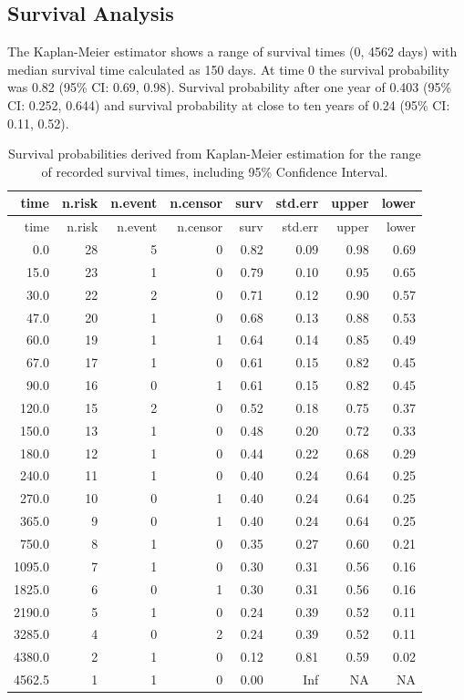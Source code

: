 \documentclass[
  authoryear,
  preprint,
  3p]{elsarticle}
\begin{document}
\hypertarget{survival-analysis-1}{%
\subsection{Survival Analysis}\label{survival-analysis-1}}

The Kaplan-Meier estimator shows a range of survival times (0, 4562
days) with median survival time calculated as 150 days. At time 0 the
survival probability was 0.82 (95\% CI: 0.69, 0.98). Survival
probability after one year of 0.403 (95\% CI: 0.252, 0.644) and survival
probability at close to ten years of 0.24 (95\% CI: 0.11, 0.52).

\begin{longtable}[]{@{}rrrrrrrr@{}}
\caption{Survival probabilities derived from Kaplan-Meier estimation for
the range of recorded survival times, including 95\% Confidence
Interval.}\tabularnewline
\toprule()
time & n.risk & n.event & n.censor & surv & std.err & upper & lower \\
\midrule()
\endfirsthead
\toprule()
time & n.risk & n.event & n.censor & surv & std.err & upper & lower \\
\midrule()
\endhead
0.0 & 28 & 5 & 0 & 0.82 & 0.09 & 0.98 & 0.69 \\
15.0 & 23 & 1 & 0 & 0.79 & 0.10 & 0.95 & 0.65 \\
30.0 & 22 & 2 & 0 & 0.71 & 0.12 & 0.90 & 0.57 \\
47.0 & 20 & 1 & 0 & 0.68 & 0.13 & 0.88 & 0.53 \\
60.0 & 19 & 1 & 1 & 0.64 & 0.14 & 0.85 & 0.49 \\
67.0 & 17 & 1 & 0 & 0.61 & 0.15 & 0.82 & 0.45 \\
90.0 & 16 & 0 & 1 & 0.61 & 0.15 & 0.82 & 0.45 \\
120.0 & 15 & 2 & 0 & 0.52 & 0.18 & 0.75 & 0.37 \\
150.0 & 13 & 1 & 0 & 0.48 & 0.20 & 0.72 & 0.33 \\
180.0 & 12 & 1 & 0 & 0.44 & 0.22 & 0.68 & 0.29 \\
240.0 & 11 & 1 & 0 & 0.40 & 0.24 & 0.64 & 0.25 \\
270.0 & 10 & 0 & 1 & 0.40 & 0.24 & 0.64 & 0.25 \\
365.0 & 9 & 0 & 1 & 0.40 & 0.24 & 0.64 & 0.25 \\
750.0 & 8 & 1 & 0 & 0.35 & 0.27 & 0.60 & 0.21 \\
1095.0 & 7 & 1 & 0 & 0.30 & 0.31 & 0.56 & 0.16 \\
1825.0 & 6 & 0 & 1 & 0.30 & 0.31 & 0.56 & 0.16 \\
2190.0 & 5 & 1 & 0 & 0.24 & 0.39 & 0.52 & 0.11 \\
3285.0 & 4 & 0 & 2 & 0.24 & 0.39 & 0.52 & 0.11 \\
4380.0 & 2 & 1 & 0 & 0.12 & 0.81 & 0.59 & 0.02 \\
4562.5 & 1 & 1 & 0 & 0.00 & Inf & NA & NA \\
\bottomrule()
\end{longtable}
\end{document}
